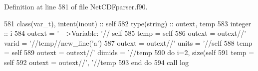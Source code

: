 Definition at line 581 of file Net\+C\+D\+Fparser.\+f90.


\begin{DoxyCode}
581     \textcolor{keywordtype}{class}(var\_t), \textcolor{keywordtype}{intent(inout)} :: self
582     \textcolor{keywordtype}{type}(string) :: outext, temp
583     \textcolor{keywordtype}{integer} :: i
584     outext = \textcolor{stringliteral}{'--->Variable: '}// self%
585     temp = self%
586     outext = outext//\textcolor{stringliteral}{'       varid = '}//temp//new\_line(\textcolor{stringliteral}{'a'})
587     outext = outext//\textcolor{stringliteral}{'       units = '}//self%
588     temp = self%
589     outext = outext//\textcolor{stringliteral}{'       dimids = '}//temp
590     \textcolor{keywordflow}{do} i=2, \textcolor{keyword}{size}(self%
591         temp = self%
592         outext = outext//\textcolor{stringliteral}{', '}//temp
593 \textcolor{keywordflow}{    end do}
594     \textcolor{keyword}{call }log%
\end{DoxyCode}
